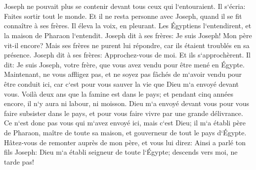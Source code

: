 \chapter{}

\verse Joseph ne pouvait plus se contenir devant tous ceux qui l`entouraient. Il s`écria: Faites sortir tout le monde. Et il ne resta personne avec Joseph, quand il se fit connaître à ses frères. 
\verse Il éleva la voix, en pleurant. Les Égyptiens l`entendirent, et la maison de Pharaon l`entendit. 
\verse Joseph dit à ses frères: Je suis Joseph! Mon père vit-il encore? Mais ses frères ne purent lui répondre, car ils étaient troublés en sa présence. 
\verse Joseph dit à ses frères: Approchez-vous de moi. Et ils s`approchèrent. Il dit: Je suis Joseph, votre frère, que vous avez vendu pour être mené en Égypte. 
\verse Maintenant, ne vous affligez pas, et ne soyez pas fâchés de m`avoir vendu pour être conduit ici, car c`est pour vous sauver la vie que Dieu m`a envoyé devant vous. 
\verse Voilà deux ans que la famine est dans le pays; et pendant cinq années encore, il n`y aura ni labour, ni moisson. 
\verse Dieu m`a envoyé devant vous pour vous faire subsister dans le pays, et pour vous faire vivre par une grande délivrance. 
\verse Ce n`est donc pas vous qui m`avez envoyé ici, mais c`est Dieu; il m`a établi père de Pharaon, maître de toute sa maison, et gouverneur de tout le pays d`Égypte. 
\verse Hâtez-vous de remonter auprès de mon père, et vous lui direz: Ainsi a parlé ton fils Joseph: Dieu m`a établi seigneur de toute l`Égypte; descends vers moi, ne tarde pas! 
